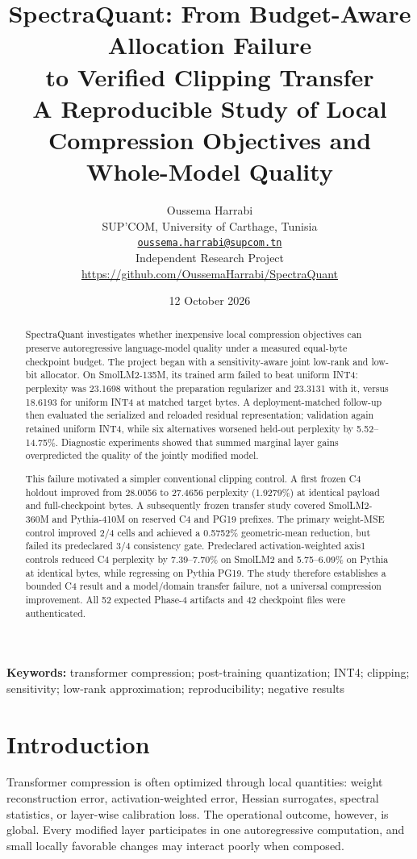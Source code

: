 \documentclass[10pt,twocolumn]{article}
\title{\vspace{-1.2em}\textbf{SpectraQuant: From Budget-Aware Allocation Failure\\
to Verified Clipping Transfer}\\[0.35em]
\large A Reproducible Study of Local Compression Objectives and Whole-Model Quality}
\author{Oussema Harrabi\\
\small SUP'COM, University of Carthage, Tunisia\\
\small \href{mailto:oussema.harrabi@supcom.tn}{\texttt{oussema.harrabi@supcom.tn}}\\
\small Independent Research Project\\
\small \url{https://github.com/OussemaHarrabi/SpectraQuant}}
\date{12 October 2026}
\begin{document}
\maketitle

\begin{abstract}
SpectraQuant investigates whether inexpensive local compression objectives can preserve
autoregressive language-model quality under a measured equal-byte checkpoint budget.
The project began with a sensitivity-aware joint low-rank and low-bit allocator.
On SmolLM2-135M, its trained arm failed to beat uniform INT4: perplexity was
23.1698 without the preparation regularizer and 23.3131 with it, versus 18.6193
for uniform INT4 at matched target bytes. A deployment-matched follow-up then
evaluated the serialized and reloaded residual representation; validation again
retained uniform INT4, while six alternatives worsened held-out perplexity by
5.52--14.75\%. Diagnostic experiments showed that summed marginal layer gains
overpredicted the quality of the jointly modified model.

This failure motivated a simpler conventional clipping control. A first frozen
C4 holdout improved from 28.0056 to 27.4656 perplexity (1.9279\%) at identical
payload and full-checkpoint bytes. A subsequently frozen transfer study covered
SmolLM2-360M and Pythia-410M on reserved C4 and PG19 prefixes. The primary
weight-MSE control improved 2/4 cells and achieved a 0.5752\% geometric-mean
reduction, but failed its predeclared 3/4 consistency gate. Predeclared
activation-weighted axis1 controls reduced C4 perplexity by 7.39--7.70\% on
SmolLM2 and 5.75--6.09\% on Pythia at identical bytes, while regressing on
Pythia PG19. The study therefore establishes a bounded C4 result and a
model/domain transfer failure, not a universal compression improvement.
All 52 expected Phase-4 artifacts and 42 checkpoint files were authenticated.
\end{abstract}

\noindent\textbf{Keywords:} transformer compression; post-training quantization;
INT4; clipping; sensitivity; low-rank approximation; reproducibility; negative results

\section{Introduction}

Transformer compression is often optimized through local quantities: weight
reconstruction error, activation-weighted error, Hessian surrogates, spectral
statistics, or layer-wise calibration loss. The operational outcome, however,
is global. Every modified layer participates in one autoregressive computation,
and small locally favorable changes may interact poorly when composed.
\end{document}

